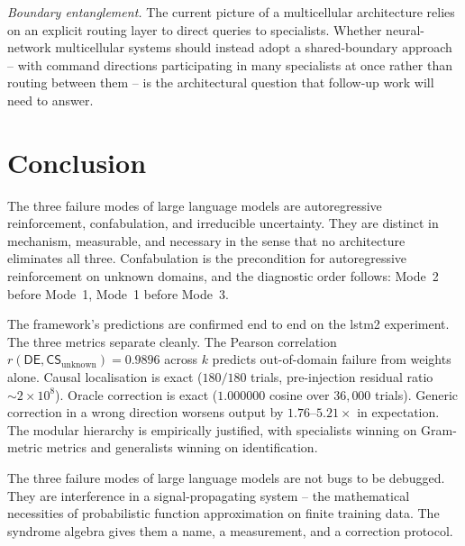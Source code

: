 \documentclass[11pt,a4paper]{article}
\newcommand{\CS}{\mathsf{CS}}
\newcommand{\DE}{\mathsf{DE}}
\begin{document}
\emph{Boundary entanglement.} The current picture of a multicellular architecture relies on an explicit routing layer to direct queries to specialists. Whether neural-network multicellular systems should instead adopt a shared-boundary approach -- with command directions participating in many specialists at once rather than routing between them -- is the architectural question that follow-up work will need to answer.


\section{Conclusion}
\label{sec:conclusion}

The three failure modes of large language models are autoregressive reinforcement, confabulation, and irreducible uncertainty. They are distinct in mechanism, measurable, and necessary in the sense that no architecture eliminates all three. Confabulation is the precondition for autoregressive reinforcement on unknown domains, and the diagnostic order follows: Mode~2 before Mode~1, Mode~1 before Mode~3.

The framework's predictions are confirmed end to end on the lstm2 experiment. The three metrics separate cleanly. The Pearson correlation $r(\DE,
\CS_{\mathrm{unknown}}) = 0.9896$ across $k$ predicts out-of-domain failure from weights alone. Causal localisation is exact ($180/180$ trials, pre-injection residual ratio $\sim 2 \times 10^8$). Oracle correction is exact ($1.000000$ cosine over $36{,}000$ trials). Generic correction in a wrong direction worsens output by $1.76$--$5.21\times$ in expectation. The modular hierarchy is empirically justified, with specialists winning on Gram-metric metrics and generalists winning on identification.

The three failure modes of large language models are not bugs to be debugged. They are interference in a signal-propagating system -- the mathematical necessities of probabilistic function approximation on finite training data. The syndrome algebra gives them a name, a measurement, and a correction protocol.

\newpage

\appendix
\end{document}
